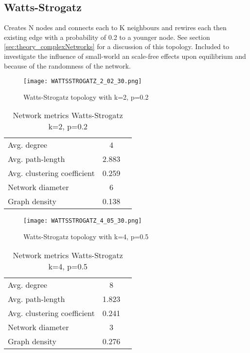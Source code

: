 \documentclass[Bachelorarbeit.tex]{subfiles}
\begin{document}
\subsection{Watts-Strogatz}
Creates N nodes and connects each to K neighbours and rewires each then existing edge with a probability of 0.2 to a younger node. See section \ref{sec:theory_complexNetworks} for a discussion of this topology.
\medskip
Included to investigate the influence of small-world an scale-free effects upon equilibrium and because of the randomness of the network.

\begin{figure}[H]
	\centering
  \texttt{[image: WATTSSTROGATZ\_2\_02\_30.png]}
	\caption{Watts-Strogatz topology with k=2, p=0.2}
	\label{fig:topology_WATTSSTROGATZ_2_02_30}
\end{figure}

\begin{table}[h]
	\centering
	\caption{Network metrics Watts-Strogatz k=2, p=0.2}
	\begin{tabular} { l c r }
		\hline
		Avg. degree & 4 \\
		Avg. path-length & 2.883 \\
		Avg. clustering coefficient & 0.259 \\
		Network diameter & 6 \\
		Graph density & 0.138 \\
		\hline
	\end{tabular}
\end{table}

\begin{figure}[H]
	\centering
  \texttt{[image: WATTSSTROGATZ\_4\_05\_30.png]}
	\caption{Watts-Strogatz topology with k=4, p=0.5}
	\label{fig:topology_WATTSSTROGATZ_4_05_30}
\end{figure}

\begin{table}[h]
	\centering
	\caption{Network metrics Watts-Strogatz k=4, p=0.5}
	\begin{tabular} { l c r }
		\hline
		Avg. degree & 8 \\
		Avg. path-length & 1.823 \\
		Avg. clustering coefficient & 0.241 \\
		Network diameter & 3 \\
		Graph density & 0.276 \\
		\hline
	\end{tabular}
\end{table}
\end{document}
